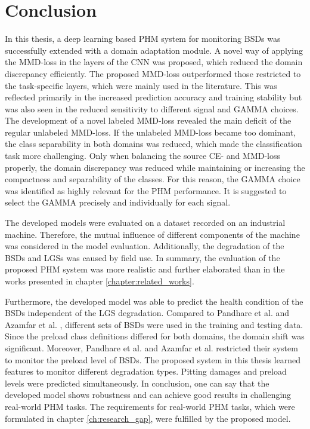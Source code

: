 \chapter{Conclusion}\label{chapter:conclusion}

In this thesis, a deep learning based PHM system for monitoring BSDs was successfully extended with a domain adaptation module. A novel way of applying the MMD-loss in the layers of the CNN was proposed, which reduced the domain discrepancy efficiently. The proposed MMD-loss outperformed those restricted to the task-specific layers, which were mainly used in the literature. This was reflected primarily in the increased prediction accuracy and training stability but was also seen in the reduced sensitivity to different signal and GAMMA choices. The development of a novel labeled MMD-loss revealed the main deficit of the regular unlabeled MMD-loss. If the unlabeled MMD-loss became too dominant, the class separability in both domains was reduced, which made the classification task more challenging. Only when balancing the source CE- and MMD-loss properly, the domain discrepancy was reduced while maintaining or increasing the compactness and separability of the classes. For this reason, the GAMMA choice was identified as highly relevant for the PHM performance. It is suggested to select the GAMMA precisely and individually for each signal.

The developed models were evaluated on a dataset recorded on an industrial machine. Therefore, the mutual influence of different components of the machine was considered in the model evaluation. Additionally, the degradation of the BSDs and LGSs was caused by field use. In summary, the evaluation of the proposed PHM system was more realistic and further elaborated than in the works presented in chapter \ref{chapter:related_works}.

Furthermore, the developed model was able to predict the health condition of the BSDs independent of the LGS degradation. Compared to Pandhare et al. \cite{Pandhare2021} and Azamfar et al. \cite{AZAMFAR2020103932}, different sets of BSDs were used in the training and testing data. Since the preload class definitions differed for both domains, the domain shift was significant.
Moreover, Pandhare et al. \cite{Pandhare2021} and Azamfar et al. \cite{AZAMFAR2020103932} restricted their system to monitor the preload level of BSDs. The proposed system in this thesis learned features to monitor different degradation types. Pitting damages and preload levels were predicted simultaneously. In conclusion, one can say that the developed model shows robustness and can achieve good results in challenging real-world PHM tasks. The requirements for real-world PHM tasks, which were formulated in chapter \ref{ch:research_gap}, were fulfilled by the proposed model.
